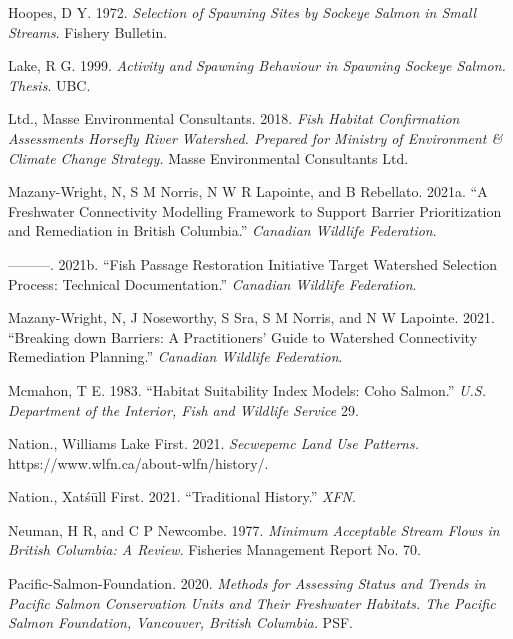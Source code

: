 \documentclass[
  letterpaper,
  DIV=11,
  numbers=noendperiod]{scrreprt}
\newlength{\cslhangindent}
\newenvironment{CSLReferences}[2] %
 {\begin{list}{}{%
  \setlength{\itemindent}{0pt}
  \setlength{\leftmargin}{0pt}
  \setlength{\parsep}{0pt}
  \ifodd #1
   \setlength{\leftmargin}{\cslhangindent}
   \setlength{\itemindent}{-1\cslhangindent}
  \fi
  \setlength{\itemsep}{#2\baselineskip}}}
 {\end{list}}
\begin{document}
\begin{CSLReferences}{1}{0}
Hoopes, D Y. 1972. \emph{Selection of Spawning Sites by Sockeye Salmon
in Small Streams}. Fishery Bulletin.

Lake, R G. 1999. \emph{Activity and Spawning Behaviour in Spawning
Sockeye Salmon. Thesis}. UBC.

Ltd., Masse Environmental Consultants. 2018. \emph{Fish Habitat
Confirmation Assessments Horsefly River Watershed. Prepared for Ministry
of Environment \& Climate Change Strategy.} Masse Environmental
Consultants Ltd.

Mazany-Wright, N, S M Norris, N W R Lapointe, and B Rebellato. 2021a.
{``A Freshwater Connectivity Modelling Framework to Support Barrier
Prioritization and Remediation in British Columbia.''} \emph{Canadian
Wildlife Federation}.

---------. 2021b. {``Fish Passage Restoration Initiative Target
Watershed Selection Process: Technical Documentation.''} \emph{Canadian
Wildlife Federation}.

Mazany-Wright, N, J Noseworthy, S Sra, S M Norris, and N W Lapointe.
2021. {``Breaking down Barriers: A Practitioners' Guide to Watershed
Connectivity Remediation Planning.''} \emph{Canadian Wildlife
Federation}.

Mcmahon, T E. 1983. {``Habitat Suitability Index Models: Coho Salmon.''}
\emph{{U.S}. Department of the Interior, Fish and Wildlife Service} 29.

Nation., Williams Lake First. 2021. \emph{Secwepemc Land Use Patterns.}
https://www.wlfn.ca/about-wlfn/history/.

Nation., Xatśūll First. 2021. {``Traditional History.''} \emph{XFN}.

Neuman, H R, and C P Newcombe. 1977. \emph{Minimum Acceptable Stream
Flows in British Columbia: A Review}. Fisheries Management Report No.
70.

Pacific-Salmon-Foundation. 2020. \emph{Methods for Assessing Status and
Trends in Pacific Salmon Conservation Units and Their Freshwater
Habitats. The Pacific Salmon Foundation, Vancouver, British Columbia.}
PSF.


\end{CSLReferences}
\end{document}

